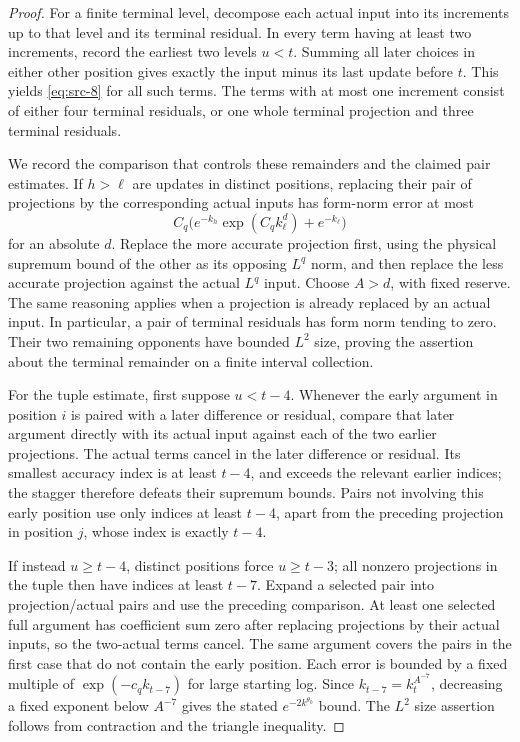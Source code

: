 \begin{proof}
For a finite terminal level, decompose each actual input into its
increments up to that level and its terminal residual.  In every
term having at least two increments, record the earliest two levels
$u<t$.  Summing all later choices in either other position gives
exactly the input minus its last update before $t$.  This yields
\eqref{eq:src-8} for all such terms.  The terms with at most one
increment consist of either four terminal residuals, or one whole
terminal projection and three terminal residuals.

We record the comparison that controls these remainders and the
claimed pair estimates.  If $h>\ell$ are updates in distinct
positions, replacing their pair of projections by the corresponding
actual inputs has form-norm error at most
\[
 C_q\bigl(e^{-k_h}\exp(C_q k_\ell^{d})+e^{-k_\ell}\bigr)
\]
for an absolute $d$.  Replace the more accurate projection first,
using the physical supremum bound of the other as its opposing
$L^q$ norm, and then replace the less accurate projection against
the actual $L^q$ input.  Choose $A>d$, with fixed reserve.  The
same reasoning applies when a projection is already replaced by
an actual input.  In particular, a pair of terminal residuals has
form norm tending to zero.  Their two remaining opponents have
bounded $L^2$ size, proving the assertion about the terminal
remainder on a finite interval collection.

For the tuple estimate, first suppose $u<t-4$.  Whenever the early
argument in position $i$ is paired with a later difference or
residual, compare that later argument directly with its actual
input against each of the two earlier projections.  The actual
terms cancel in the later difference or residual.  Its smallest
accuracy index is at least $t-4$, and exceeds the relevant earlier
indices; the stagger therefore defeats their supremum bounds.
Pairs not involving this early position use only indices at least
$t-4$, apart from the preceding projection in position $j$, whose
index is exactly $t-4$.

If instead $u\ge t-4$, distinct positions force $u\ge t-3$;
all nonzero projections in the tuple then have indices at least
$t-7$.  Expand a selected pair into projection/actual pairs and
use the preceding comparison.  At least one selected full
argument has coefficient sum zero after replacing projections by
their actual inputs, so the two-actual terms cancel.  The same
argument covers the pairs in the first case that do not contain
the early position.  Each error is bounded by a fixed multiple
of $\exp(-c_q k_{t-7})$ for large starting log.  Since
$k_{t-7}=k_t^{A^{-7}}$, decreasing a fixed exponent below
$A^{-7}$ gives the stated $e^{-2k^{\theta_0}}$ bound.  The
$L^2$ size assertion follows from contraction and the triangle
inequality.
\end{proof}

